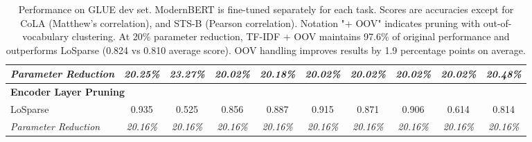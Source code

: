 \begin{table*}[h]
\begin{tabular}{l@{\hspace{25pt}}ccccccccc}
\textit{Parameter Reduction} & \textit{20.25\%} & \textit{23.27\%} & \textit{20.02\%} & \textit{20.18\%} & \textit{20.02\%} & \textit{20.02\%} & \textit{20.02\%} & \textit{20.02\%} & \textit{20.48\%} \\
\midrule
\multicolumn{10}{l}{\textbf{Encoder Layer Pruning}} \\
LoSparse & 0.935 & 0.525 & 0.856 & 0.887 & 0.915 & 0.871 & 0.906 & 0.614 & 0.814 \\
\textit{Parameter Reduction} & \textit{20.16\%} & \textit{20.16\%} & \textit{20.16\%} & \textit{20.16\%} & \textit{20.16\%} & \textit{20.16\%} & \textit{20.16\%} & \textit{20.16\%} & \textit{20.16\%} \\
\bottomrule
\end{tabular}
\caption{Performance on GLUE dev set. ModernBERT is fine-tuned separately for each task. Scores are accuracies except for CoLA (Matthew's correlation), and STS-B (Pearson correlation). Notation "+ OOV" indicates pruning with out-of-vocabulary clustering. At 20\% parameter reduction, TF-IDF + OOV maintains 97.6\% of original performance and outperforms LoSparse (0.824 vs 0.810 average score). OOV handling improves results by 1.9 percentage points on average.}


\label{tab:results}
\end{table*}